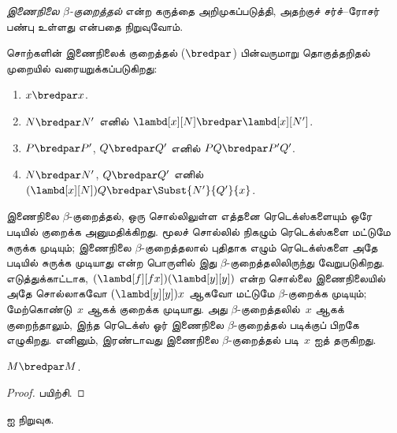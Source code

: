 \documentclass[../../../include/open-logic-section]{subfiles}
\begin{document}


\emph{இணைநிலை $\beta$-குறைத்தல்} என்ற கருத்தை அறிமுகப்படுத்தி, அதற்குச்
சர்ச்--ரோசர் பண்பு உள்ளது என்பதை நிறுவுவோம்.

\begin{defn} 
  சொற்களின் இணைநிலைக் குறைத்தல் ($\bredpar$) பின்வருமாறு தொகுத்தறிதல்
  முறையில் வரையறுக்கப்படுகிறது:
  \begin{enumerate}
    \item {} $x \bredpar x$.
    \item {} $N \bredpar N'$ எனில்
      $\lambd[x][N] \bredpar \lambd[x][N']$.
    \item {} $P \bredpar P'$, $Q \bredpar Q'$ எனில்
      $PQ \bredpar P'Q'$.
    \item {} $N \bredpar N'$, $Q \bredpar Q'$ எனில்
      $(\lambd[x][N])Q \bredpar \Subst{N'}{Q'}{x}$.
  \end{enumerate}
\end{defn}

இணைநிலை $\beta$-குறைத்தல், ஒரு சொல்லிலுள்ள எத்தனை ரெடெக்ஸ்களையும் ஒரே படியில்
குறைக்க அனுமதிக்கிறது. மூலச் சொல்லில் நிகழும் ரெடெக்ஸ்களை மட்டுமே சுருக்க
முடியும்; இணைநிலை $\beta$-குறைத்தலால் புதிதாக எழும் ரெடெக்ஸ்களை அதே படியில்
சுருக்க முடியாது என்ற பொருளில் இது $\beta$-குறைத்தலிலிருந்து வேறுபடுகிறது.
எடுத்துக்காட்டாக, $(\lambd[f][fx])(\lambd[y][y])$ என்ற சொல்லை இணைநிலையில்
அதே சொல்லாகவோ $(\lambd[y][y])x$ ஆகவோ மட்டுமே $\beta$-குறைக்க முடியும்;
மேற்கொண்டு~$x$ ஆகக் குறைக்க முடியாது. அது $\beta$-குறைத்தலில்~$x$ ஆகக்
குறைந்தாலும், இந்த ரெடெக்ஸ் ஓர் இணைநிலை $\beta$-குறைத்தல் படிக்குப் பிறகே
எழுகிறது. எனினும், இரண்டாவது இணைநிலை $\beta$-குறைத்தல் படி~$x$ ஐத் தருகிறது.

\begin{thm}
  $M \bredpar M$.
\end{thm}

\begin{proof}
  பயிற்சி.
\end{proof}

\begin{prob}
   ஐ நிறுவுக.
\end{prob}
\end{document}
